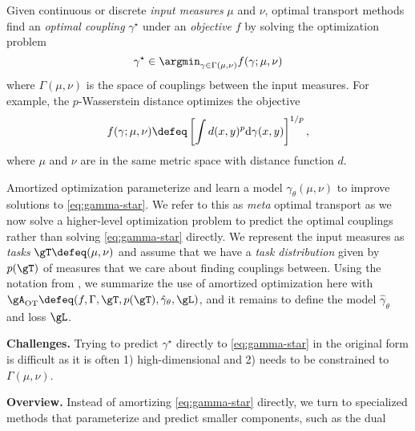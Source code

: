 Given continuous or discrete \emph{input measures} $\mu$ and $\nu$,
optimal transport methods find an \emph{optimal coupling} $\gamma^\star$
under an \emph{objective} $f$ by solving the optimization problem
\begin{equation}
  \gamma^\star\in \argmin_{\gamma\in\Gamma(\mu,\nu)} f(\gamma; \mu, \nu)
  \label{eq:gamma-star}
\end{equation}
where $\Gamma(\mu,\nu)$ is the space of couplings between
the input measures.
For example, the $p$-Wasserstein distance
\citep{villani2009optimal,peyre2019computational} optimizes
the objective
\begin{equation}
  \label{eq:W2_obj}
  f(\gamma; \mu, \nu)\defeq \left[\int d(x, y)^p {\rm d}\gamma(x,y)\right]^{1/p},
\end{equation}
where $\mu$ and $\nu$ are in the same metric space with
distance function $d$.

Amortized optimization parameterize and
learn a model $\hat \gamma_\theta(\mu, \nu)$ to improve
solutions to \cref{eq:gamma-star}.
We refer to this as \emph{meta} optimal transport
as we now solve a higher-level optimization problem
to predict the optimal couplings rather than solving
\cref{eq:gamma-star} directly.
We represent the input measures as \emph{tasks}
$\gT\defeq(\mu, \nu)$ and assume that we have a
\emph{task distribution} given by $p(\gT)$ of measures
that we care about finding couplings between.
Using the notation from \citep{amos2022tutorial},
we summarize the use of amortized optimization here with
$\gA_{\rm OT}\defeq (f, \Gamma, \gT, p(\gT), \hat \gamma_\theta, \gL)$,
and it remains to define the model $\hat \gamma_\theta$ and
loss $\gL$.

\textbf{Challenges.}
Trying to predict $\gamma^\star$ directly to \cref{eq:gamma-star}
in the original form is difficult as it is often
1) high-dimensional and 2) needs to be
constrained to $\Gamma(\mu, \nu)$.

\textbf{Overview.} Instead of amortizing \cref{eq:gamma-star}
directly, we turn to specialized methods that parameterize
and predict smaller components, such as the dual
